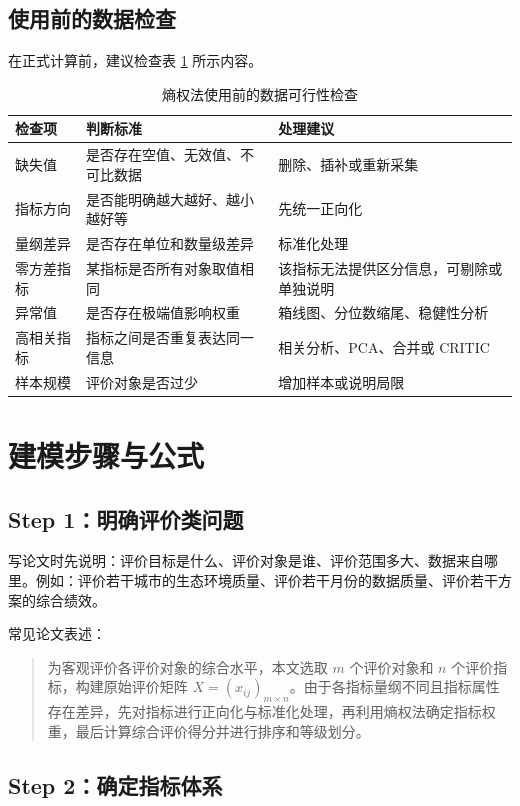 \documentclass[UTF8,a4paper,12pt]{ctexart}
\begin{document}
\subsection{使用前的数据检查}

在正式计算前，建议检查表 \ref{tab:check} 所示内容。

\begin{table}[H]
\centering
\caption{熵权法使用前的数据可行性检查}
\label{tab:check}
\begin{tabular}{p{3.2cm}p{7.0cm}p{4.0cm}}
\toprule
检查项 & 判断标准 & 处理建议\\
\midrule
缺失值 & 是否存在空值、无效值、不可比数据 & 删除、插补或重新采集\\
指标方向 & 是否能明确越大越好、越小越好等 & 先统一正向化\\
量纲差异 & 是否存在单位和数量级差异 & 标准化处理\\
零方差指标 & 某指标是否所有对象取值相同 & 该指标无法提供区分信息，可剔除或单独说明\\
异常值 & 是否存在极端值影响权重 & 箱线图、分位数缩尾、稳健性分析\\
高相关指标 & 指标之间是否重复表达同一信息 & 相关分析、PCA、合并或 CRITIC\\
样本规模 & 评价对象是否过少 & 增加样本或说明局限\\
\bottomrule
\end{tabular}
\end{table}

\section{建模步骤与公式}

\subsection{Step 1：明确评价类问题}

写论文时先说明：评价目标是什么、评价对象是谁、评价范围多大、数据来自哪里。例如：评价若干城市的生态环境质量、评价若干月份的数据质量、评价若干方案的综合绩效。

常见论文表述：
\begin{quote}
为客观评价各评价对象的综合水平，本文选取 $m$ 个评价对象和 $n$ 个评价指标，构建原始评价矩阵 $X=(x_{ij})_{m\times n}$。由于各指标量纲不同且指标属性存在差异，先对指标进行正向化与标准化处理，再利用熵权法确定指标权重，最后计算综合评价得分并进行排序和等级划分。
\end{quote}

\subsection{Step 2：确定指标体系}
\end{document}
